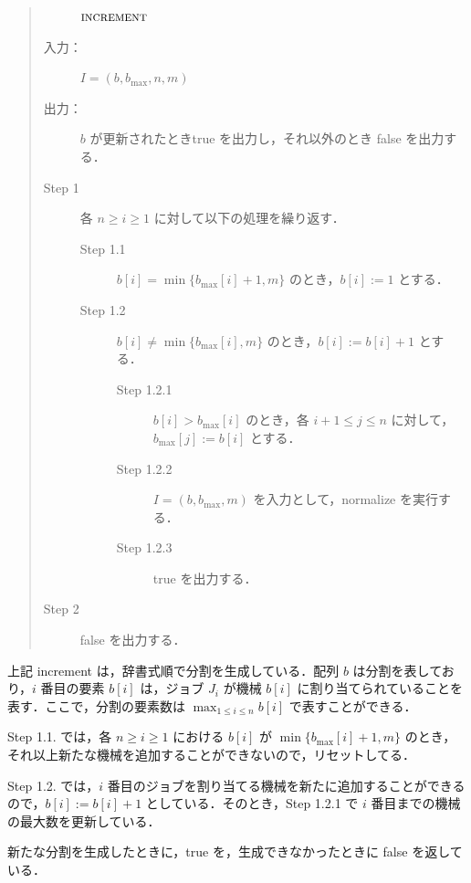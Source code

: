\documentclass[12pt]{optlab-bachelor}
\begin{document}
\begin{quote}
  \begin{description}
    \item[]  ${\mbox {\bf{\sc increment}}}$
    \item[入力：] $I = (b,b_{\max},n, m)$
    \item[出力：] $b$ が更新されたとき{\sc true} を出力し，それ以外のとき {\sc false} を出力する．
  \end{description}
  \begin{description}
    \item[Step 1] 各 $n \ge i \ge 1$ に対して以下の処理を繰り返す．
    \begin{description}
      \item[Step 1.1] $b[i] = \min\{b_{\max}[i] + 1, m\}$ のとき，$b[i] := 1$ とする．
      \item[Step 1.2] $b[i] \neq \min\{b_{\max}[i], m\}$ のとき，$b[i] := b[i] + 1$ とする．
      \begin{description}
        \item[Step 1.2.1] $b[i] > b_{\max}[i]$ のとき，各 $i + 1 \le j \le n$ に対して，$b_{\max}[j] := b[i]$ とする．
        \item[Step 1.2.2] $I = (b,b_{\max},m)$ を入力として，{\sc normalize} を実行する．
        \item[Step 1.2.3] {\sc true} を出力する．
      \end{description}
    \end{description}
    \item[Step 2] {\sc false} を出力する．
  \end{description}
\end{quote}

上記 {\sc increment} は，辞書式順で分割を生成している．配列 $b$ は分割を表しており，$i$ 番目の要素 $b[i]$ は，ジョブ $J_i$ が機械 $b[i]$ に割り当てられていることを表す．ここで，分割の要素数は $\displaystyle \max_{1 \le i \le n}b[i]$ で表すことができる．

Step 1.1. では，各 $n \ge i \ge 1$ における $b[i]$ が $\min\{b_{\max}[i] + 1, m\}$ のとき，それ以上新たな機械を追加することができないので，リセットしてる．

Step 1.2. では，$i$ 番目のジョブを割り当てる機械を新たに追加することができるので，$b[i] := b[i] + 1$ としている．そのとき，Step 1.2.1 で $i$ 番目までの機械の最大数を更新している．

新たな分割を生成したときに，{\sc true} を，生成できなかったときに {\sc false} を返している．
\end{document}
